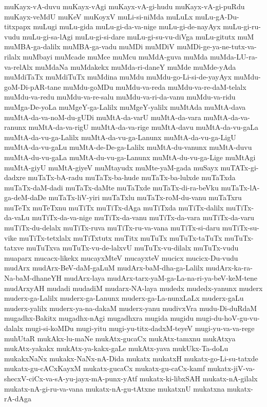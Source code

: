 {muKayx-vA-duvu
muKayx-vAgi
muKayx-vA-gi-hudu
muKayx-vA-gi-puRdu
muKayx-veMdU
muKeV
muKoyxV
muLi-si-niMda
muLuLx
muLu-gA-Du-titxpapx
muLugi
muLu-gida
muLu-gi-da-va-nige
muLu-gi-de-nayAyx
muLu-gi-ru-vudu
muLu-gi-sa-lAgi
muLu-gi-si-dare
muLu-gi-su-vu-diVga
muLu-gitutx
muM
muMBA-ga-dalilx
muMBA-ga-vadu
muMDi
muMDiV
muMDi-ge-ya-ne-tutx-va-rilalx
muMbayi
muMcade
muMce
muMcu
muMdA-guva
muMda
muMda-LU-ra-va-relAlx
muMdaNa
muMdakekx
muMda-ri-daneY
muMde
muMde-yAda
muMdiTaTx
muMdiTuTx
muMdina
muMdu
muMdu-go-Li-si-de-yayAyx
muMdu-goM-Di-pAR-tane
muMdu-goMDu
muMdu-va-reda
muMdu-va-re-daM-telalx
muMdu-va-redu
muMdu-va-re-salu
muMdu-va-ri-da-vanu
muMdu-va-ridu
muMga-De-yoLa
muMgeY-ga-Lalilx
muMgeY-yalilx
muMtAda
muMtA-dava
muMtA-da-va-noM-du-gUDi
muMtA-da-varU
muMtA-da-vara
muMtA-da-va-ranunx
muMtA-da-va-rigU
muMtA-da-va-rige
muMtA-davu
muMtA-da-vu-gaLa
muMtA-da-vu-ga-Lalilx
muMtA-da-vu-ga-Lanunx
muMtA-da-vu-ga-LigU
muMtA-da-vu-gaLu
muMtA-de-De-ga-Lalilx
muMtA-du-vanunx
muMtA-duvu
muMtA-du-vu-gaLa
muMtA-du-vu-ga-Lanunx
muMtA-du-vu-ga-Lige
muMtAgi
muMtA-giyU
muMtA-giyeV
muMtayudx
muMte-yaM-gada
muSayx
muTATx-gi-dadxre
muTaTx-bA-radu
muTaTx-ba-hude
muTaTx-ba-lulxde
muTaTxda
muTaTx-daM-dadi
muTaTx-daMte
muTaTxde
muTaTx-di-ra-beVku
muTaTx-lA-ga-deM-daDe
muTaTx-liV-yiri
muTaTxlu
muTaTx-roM-du-vanu
muTaTxru
muTeTx
muTeTxnu
muTiTx
muTiTx-dAga
muTiTxda
muTiTx-dalilx
muTiTx-da-vaLu
muTiTx-da-va-nige
muTiTx-da-vanu
muTiTx-da-vara
muTiTx-da-varu
muTiTx-du-delalx
muTiTx-ruva
muTiTx-ru-va-vana
muTiTx-si-daru
muTiTx-su-vike
muTiTx-tetxlalx
muTiTxtutx
muTitx
muTuTx
muTuTx-taTuTx
muTuTx-tatxve
muTuTxva
muTuTx-vu-de-lalxvU
muTuTx-vu-dilalx
muTuTx-vudu
muaparx
mucacx-likekx
mucayxMteV
mucayxteV
mucicx
mucicx-Du-vudu
mudArx
mudArx-BeV-daM-gaLuM
mudArx-baM-dha-ga-Lalilx
mudArx-ka-ra-Na-baM-dhaneYH
mudArx-laya
mudArx-tarx-yaM-ga-La-na-ri-ya-beV-keM-tene
mudArxyAH
mudadi
mudadiM
mudarx-NA-laya
mudedx
mudedx-yanunx
muderx
muderx-ga-Lalilx
muderx-ga-Lanunx
muderx-ga-La-nunxLaLx
muderx-gaLu
muderx-yalilx
muderx-ya-na-dakaM
muderx-yanu
mudivxVra
mudu-Di-duRdaM
mugadhx-Bakitx
mugadhx-nAgi
mugadhxra
mugida
mugidu
mugi-du-hoV-gu-vu-dalalx
mugi-si-koMDu
mugi-yitu
mugi-yu-titx-dadxM-teyeV
mugi-yu-va-va-rege
muhUtaR
mukAkx-lu-maNe
mukAtx-gucaCx
mukAtx-tamxnu
mukAtxya
mukAtx-yakakx
mukAtx-ya-kakx-gaLe
mukAtx-yava
mukUkx-Ta-doLu
mukakxNaNx
mukakx-NaNx-nA-Dida
mukatx
mukatxH
mukatx-go-Li-su-tatxde
mukatx-gu-cACxKayxM
mukatx-gucaCx
mukatx-gu-caCx-kamf
mukatx-jiV-va-shecxV-ciCx-va-sA-yu-jayx-mA-punx-yAtf
mukatx-ki-libxSAH
mukatx-nA-gilalx
mukatx-nA-gi-ru-va-vana
mukatx-nA-gu-tAtxne
mukatxnU
mukatxna
mukatx-rA-dAga
}
